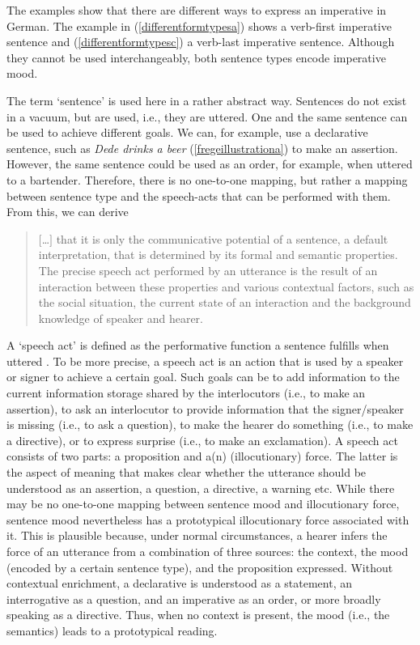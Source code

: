\noindent The examples show that there are different ways to express an imperative in German. The example in (\ref{differentformtypesa}) shows a verb-first imperative sentence and (\ref{differentformtypesc}) a verb-last imperative sentence. Although they cannot be used interchangeably, both sentence types encode imperative mood.

The term `sentence' is used here in a rather abstract way. Sentences do not exist in a vacuum, but are used, i.e., they are uttered. One and the same sentence can be used to achieve different goals. We can, for example, use a declarative sentence, such as \textit{Dede drinks a beer} (\ref{fregeillustrationa}) to make an assertion. However, the same sentence could be used as an order, for example, when uttered to a bartender. Therefore, there is no one-to-one mapping, but rather a mapping between sentence type and the speech-acts that can be performed with them. From this, we can derive

\begin{quote}
$[$\dots $]$ that it is only the communicative potential of a sentence, a default interpretation, that is determined by its formal and semantic properties. The precise speech act performed by an utterance is the result of an interaction between these properties and various contextual factors, such as the social situation, the current state of an interaction and the background knowledge of speaker and hearer. \citep[277]{konig2007speech}
\end{quote}

\noindent A `speech act' is defined as the performative function a sentence fulfills when uttered \citep{austin1962things}. To be more precise, a speech act is an action that is used by a speaker or signer to achieve a certain goal. Such goals can be to add information to the current information storage shared by the interlocutors (i.e., to make an assertion), to ask an interlocutor to provide information that the signer/speaker is missing (i.e., to ask a question), to make the hearer do something (i.e., to make a directive), or to express surprise (i.e., to make an exclamation). A speech act consists of two parts: a proposition and a(n) (illocutionary) force. The latter is the aspect of meaning that makes clear whether the utterance should be understood as an assertion, a question, a directive, a warning etc. While there may be no one-to-one mapping between sentence mood and illocutionary force, sentence mood nevertheless has a prototypical illocutionary force associated with it. This is plausible because, under normal circumstances, a hearer infers the force of an utterance from a combination of three sources:\label{threesources} the context, the mood (encoded by a certain sentence type), and the proposition expressed. Without contextual enrichment, a declarative is understood as a statement, an interrogative as a question, and an imperative as an order, or more broadly speaking as a directive. Thus, when no context is present, the mood (i.e., the semantics) leads to a prototypical reading.



